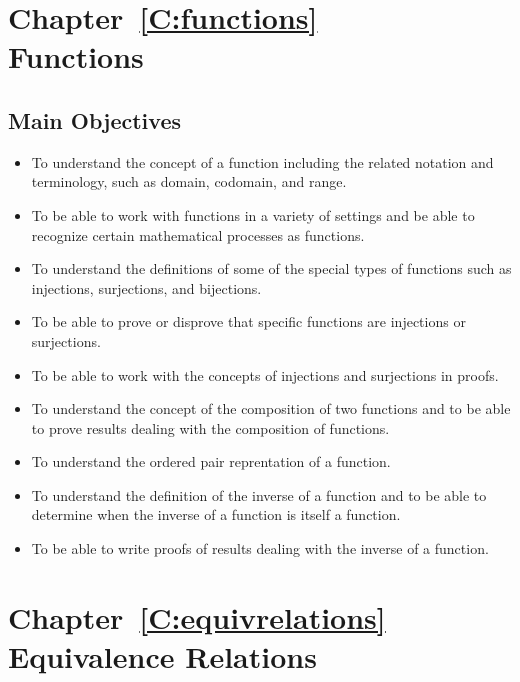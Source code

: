 



\chapter*{Chapter~\ref{C:functions} \\Functions}

\section*{Main Objectives}
\begin{itemize}
\item To understand the concept of a function including the related notation and terminology, such as domain, codomain, and range.
\item To be able to work with functions in a variety of settings and be able to recognize certain mathematical processes as functions.
\item To understand the definitions of some of the special types of functions such as injections, surjections, and bijections.
\item To be able to prove or disprove that specific functions are injections or surjections.
\item To be able to work with the concepts of injections and surjections in proofs.
\item To understand the concept of the composition of two functions and to be able to prove results dealing with the composition of functions.
\item To understand the ordered pair reprentation of a function.
\item To understand the definition of the inverse of a function and to be able to determine when the inverse of a function is itself a function.
\item To be able to write proofs of results dealing with the inverse of a function.
\end{itemize}
\hbreak









\chapter*{Chapter~\ref{C:equivrelations} \\Equivalence Relations}

